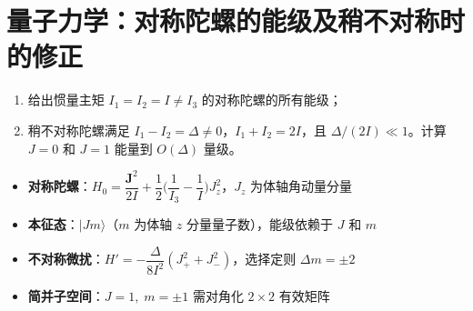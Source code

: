 \section{量子力学：对称陀螺的能级及稍不对称时的修正}
\label{sec:symmetric-top-asymmetry}

\begin{modelbox}[题目：对称陀螺的能级及稍不对称时的修正]
\begin{enumerate}
    \item 给出惯量主矩 $I_1=I_2=I\neq I_3$ 的对称陀螺的所有能级；
    \item 稍不对称陀螺满足 $I_1-I_2=\Delta\neq0$，$I_1+I_2=2I$，且 $\Delta/(2I)\ll1$。计算 $J=0$ 和 $J=1$ 能量到 $O(\Delta)$ 量级。
\end{enumerate}
\end{modelbox}

\begin{tipbox}[考点快速分析]
\begin{itemize}
    \item \textbf{对称陀螺}：$H_0=\dfrac{\mathbf{J}^2}{2I}+\dfrac12\bigl(\dfrac{1}{I_3}-\dfrac{1}{I}\bigr)J_z^2$，$J_z$ 为体轴角动量分量
    \item \textbf{本征态}：$|Jm\rangle$（$m$ 为体轴 $z$ 分量量子数），能级依赖于 $J$ 和 $m$
    \item \textbf{不对称微扰}：$H'=-\dfrac{\Delta}{8I^2}(J_+^2+J_-^2)$，选择定则 $\Delta m=\pm2$
    \item \textbf{简并子空间}：$J=1,\;m=\pm1$ 需对角化 $2\times2$ 有效矩阵
\end{itemize}
\end{tipbox}

